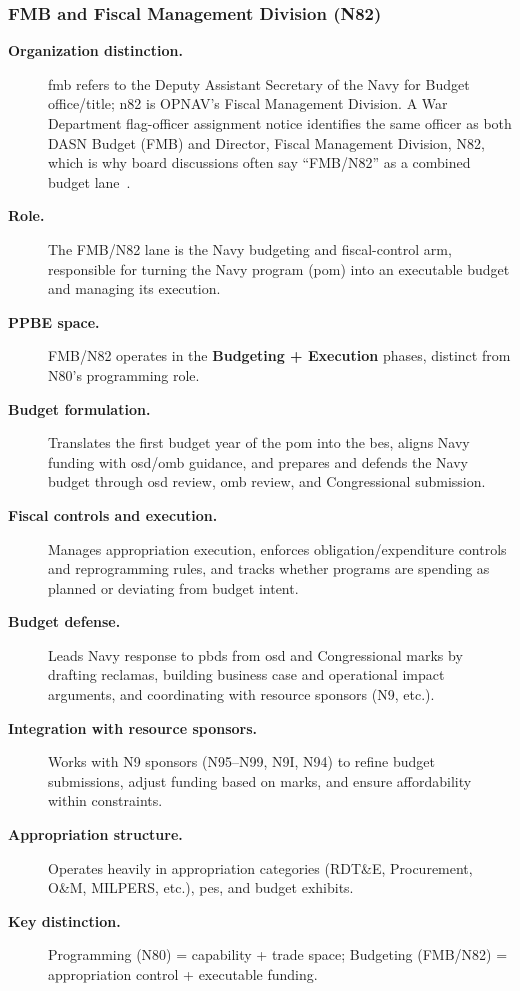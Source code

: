 \documentclass[../main.tex]{subfiles}
\begin{document}
\subsubsection{FMB and Fiscal Management Division (N82)}
\label{subsec:fmb}
\begin{description}
  \item[\textbf{Organization distinction.}] \ac{fmb} refers to the Deputy Assistant Secretary of the Navy for Budget office/title; \ac{n82} is OPNAV's Fiscal Management Division. A War Department flag-officer assignment notice identifies the same officer as both DASN Budget (FMB) and Director, Fiscal Management Division, N82, which is why board discussions often say ``FMB/N82'' as a combined budget lane~\autocite{WarGov-Flag-Officer-Assignments-FMB-N82-2020}.
  \item[\textbf{Role.}] The FMB/N82 lane is the Navy budgeting and fiscal-control arm, responsible for turning the Navy program (\ac{pom}) into an executable budget and managing its execution.
  \item[\textbf{PPBE space.}] FMB/N82 operates in the \textbf{Budgeting + Execution} phases, distinct from N80's programming role.
  \item[\textbf{Budget formulation.}] Translates the first budget year of the \ac{pom} into the \ac{bes}, aligns Navy funding with \ac{osd}/\ac{omb} guidance, and prepares and defends the Navy budget through \ac{osd} review, \ac{omb} review, and Congressional submission.
  \item[\textbf{Fiscal controls and execution.}] Manages appropriation execution, enforces obligation/expenditure controls and reprogramming rules, and tracks whether programs are spending as planned or deviating from budget intent.
  \item[\textbf{Budget defense.}] Leads Navy response to \acp{pbd} from \ac{osd} and Congressional marks by drafting reclamas, building business case and operational impact arguments, and coordinating with resource sponsors (N9, etc.).
  \item[\textbf{Integration with resource sponsors.}] Works with N9 sponsors (N95--N99, N9I, N94) to refine budget submissions, adjust funding based on marks, and ensure affordability within constraints.
  \item[\textbf{Appropriation structure.}] Operates heavily in appropriation categories (RDT\&E, Procurement, O\&M, MILPERS, etc.), \acp{pe}, and budget exhibits.
  \item[\textbf{Key distinction.}] Programming (N80) = capability + trade space; Budgeting (FMB/N82) = appropriation control + executable funding.
\end{description}
~
\end{document}
